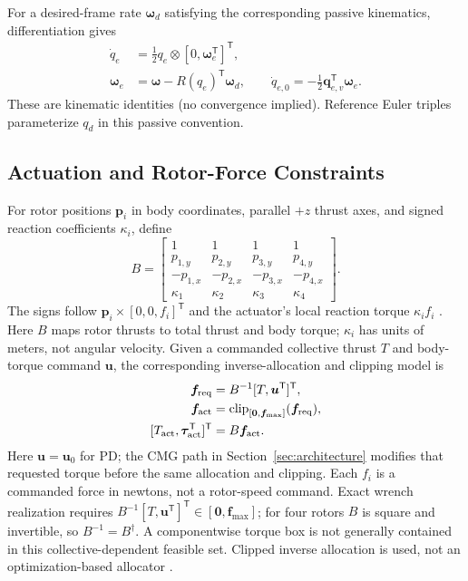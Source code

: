 \documentclass[letterpaper, 10 pt, conference]{ieeeconf}
\newcommand{\T}{^{\mathsf T}}
\newcommand{\clip}{\operatorname{clip}}
\begin{document}
For a desired-frame rate $\bm\omega_d$ satisfying the corresponding passive kinematics, differentiation gives
\begin{align}
 \dot q_e&=\tfrac12q_e\otimes[0,\bm\omega_e\T]\T,\\
 \bm\omega_e&=\bm\omega-R(q_e)\T\bm\omega_d,\qquad
 \dot q_{e,0}=-\tfrac12\bm q_{e,v}\T\bm\omega_e.
 \label{eq:errkin}
\end{align}
These are kinematic identities (no convergence implied). Reference Euler triples parameterize $q_d$ in this passive convention.

\subsection{Actuation and Rotor-Force Constraints}
\label{sec:actuation}
For rotor positions $\bm p_i$ in body coordinates, parallel $+z$ thrust
axes, and signed reaction coefficients $\kappa_i$, define
\begin{equation}
 B=\begin{bmatrix}
 1&1&1&1\\p_{1,y}&p_{2,y}&p_{3,y}&p_{4,y}\\
 -p_{1,x}&-p_{2,x}&-p_{3,x}&-p_{4,x}\\
 \kappa_1&\kappa_2&\kappa_3&\kappa_4
 \end{bmatrix}.
 \label{eq:allocationmatrix}
\end{equation}
The signs follow $\bm p_i\times[0,0,f_i]\T$ and the actuator's local reaction torque $\kappa_i f_i$ \cite{garciacarrillo2013quad}. Here $B$ maps rotor thrusts to total thrust and body torque; $\kappa_i$ has units of meters, not angular velocity. Given a commanded collective thrust $T$ and body-torque command $\bm u$, the corresponding inverse-allocation and clipping model is
\begin{equation}
 \begin{aligned}
 \bm f_{\rm req}&=B^{-1}[T,\bm u\T]\T,\\
 \bm f_{\rm act}&=\clip_{[\bm0,\bm f_{\max}]}(\bm f_{\rm req}),\\
 [T_{\rm act},\bm\tau_{\rm act}\T]\T&=B\bm f_{\rm act}.
 \end{aligned}
 \label{eq:mixer}
\end{equation}
Here $\bm u=\bm u_0$ for PD; the CMG path in Section~\ref{sec:architecture}
modifies that requested torque before the same allocation and clipping.
Each $f_i$ is a commanded force in newtons, not a rotor-speed command.
Exact wrench realization requires $B^{-1}[T,\bm u\T]\T\in[\bm0,\bm f_{\max}]$; for four
rotors $B$ is square and invertible, so $B^{-1}=B^{\dagger}$.
A componentwise torque box is not generally contained in this
collective-dependent feasible set. Clipped inverse allocation is used,
not an optimization-based allocator \cite{monteiro2016allocation}.
\end{document}
